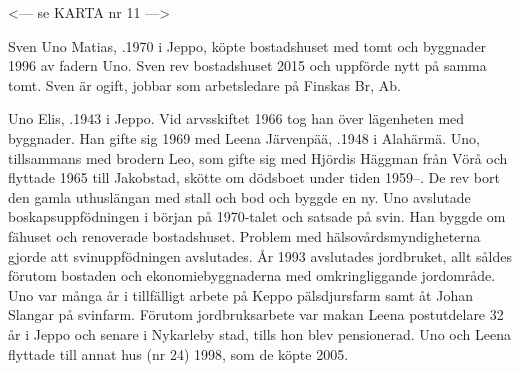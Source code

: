 <--- se KARTA nr 11 --->




%


%
Sven Uno Matias, .1970 i Jeppo, köpte bostadshuset med tomt och byggnader 1996 av fadern Uno. Sven rev bostadshuset 2015 och uppförde nytt på samma tomt. Sven är ogift, jobbar som arbetsledare på Finskas Br, Ab.\jhvspace{}



%
Uno Elis, .1943 i Jeppo. Vid arvsskiftet 1966 tog han över lägenheten med byggnader. Han gifte sig 1969 med Leena Järvenpää, .1948 i Alahärmä. Uno, tillsammans med brodern Leo, som gifte sig med Hjördis Häggman från Vörå och flyttade 1965 till Jakobstad, skötte om  dödsboet under tiden 1959--. De rev bort den gamla uthuslängan med stall och bod och byggde en ny. Uno avslutade boskapsuppfödningen i början på 1970-talet och satsade på svin. Han byggde om fähuset och renoverade bostadshuset. Problem med hälsovårdsmyndigheterna gjorde att svinuppfödningen avslutades. År 1993 avslutades jordbruket, allt såldes förutom bostaden och ekonomiebyggnaderna med omkringliggande jordområde. Uno var många år i tillfälligt arbete på Keppo pälsdjursfarm samt åt Johan Slangar på svinfarm. Förutom jordbruksarbete var makan Leena postutdelare 32 år i Jeppo och senare i Nykarleby stad, tills hon blev pensionerad. Uno och Leena flyttade till annat hus (nr 24) 1998, som de köpte 2005.
\begin{jhchildren}
  \item {}
  \item {}
  \item {}
\end{jhchildren}



